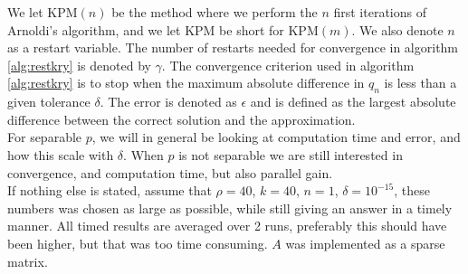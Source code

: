 We let KPM$(n)$ be the method where we perform the $n$ first iterations of Arnoldi's algorithm, and we let KPM be short for KPM$(m)$. We also denote $n$ as a restart variable. The number of restarts needed for convergence in algorithm \ref{alg:restkry} is denoted by $\gamma$. The convergence criterion used in algorithm \ref{alg:restkry} is to stop when the maximum absolute difference in $q_n$ is less than a given tolerance $\delta$. The error is denoted as $\epsilon$ and is defined as the largest absolute difference between the correct solution and the approximation. \\
 
For separable $p$, we will in general be looking at computation time and error, and how this scale with $\delta$. When $p$ is not separable we are still interested in convergence, and computation time, but also parallel gain. \\

If nothing else is stated, assume that $\rho =40$, $k = 40$, $n = 1$, $\delta = 10^{-15}$, these numbers was chosen as large as possible, while still giving an answer in a timely manner. All timed results are averaged over 2 runs, preferably this should have been higher, but that was too time consuming. $A$ was implemented as a sparse matrix.\\


